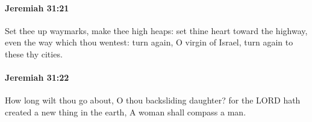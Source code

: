 		\paragraph{Jeremiah 31:21} %
			\label{JEREMIAH-31-21}

			Set thee up waymarks, make thee high heaps: set thine heart toward the highway, even the way which thou wentest: turn again, O virgin of Israel, turn again to these thy cities.


		\paragraph{Jeremiah 31:22} %
			\label{JEREMIAH-31-22}

			How long wilt thou go about, O thou backsliding daughter? for the LORD hath created a new thing in the earth, A woman shall compass a man.


